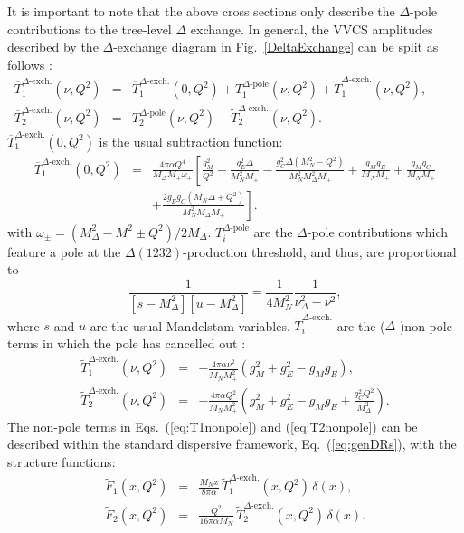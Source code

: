 \documentclass[12pt,preprint,tightenlines,
showpacs,preprintnumbers,amsmath,amssymb,
a4paper,nofootinbib]{revtex4-1}
\def\beq{\begin{equation}}
\def\eeq{\end{equation}}
\def\bea{\begin{eqnarray}}
\def\eea{\end{eqnarray}}
\def\eqlab#1{\label{eq:#1}}
\def\Eqref#1{Eq.~(\ref{eq:#1})}
\def\al{\alpha}
\def\nn{\nonumber}
\def\ol#1{\overline{#1}}
\begin{document}
It is important to note that the above cross sections only describe the $\Delta$-pole contributions to the tree-level $\Delta$ exchange. In general, the VVCS amplitudes described by the $\Delta$-exchange diagram in Fig.~\ref{DeltaExchange} can be split as follows \cite{Hagelstein:2018bdi}:
\bea
\ol T_1^{\Delta\text{-exch.}}(\nu,Q^2)&=&\ol T_1^{\Delta\text{-exch.}}(0,Q^2)+T_1^{\Delta\text{-pole}}(\nu,Q^2)+\widetilde T_1^{\Delta\text{-exch.}}(\nu,Q^2),\qquad\;\\
\ol T_2^{\Delta\text{-exch.}}(\nu,Q^2)&=&T_2^{\Delta\text{-pole}}(\nu,Q^2)+\widetilde T_2^{\Delta\text{-exch.}}(\nu,Q^2).
\eea
$\ol T_1^{\Delta\text{-exch.}}(0,Q^2)$ is the usual subtraction function:
\bea
\ol T_1^{\Delta\text{-exch.}}(0,Q^2)&=&\frac{4\pi \al Q^4}{M_\Delta M_+ \omega_+}\left[\frac{g_M^2}{Q^2}-\frac{g_E^2 \varDelta}{M_N^2 M_+}-\frac{g_C^2 \varDelta \left(M_N^2-Q^2\right)}{M_N^2 M_\Delta^2 M_+}+\frac{g_M g_E}{M_N M_+}+\frac{g_M g_C}{M_N M_+}\right.\eqlab{T1su}\\
&&+\left.\frac{2 g_E g_C \left(M_N\varDelta +Q^2\right)}{M_N^2 M_\Delta M_+}\right].\nn
\eea
with  $\omega_\pm=(M_\Delta^2-M^2\pm Q^2)/2M_\Delta$. $T_i^{\Delta\text{-pole}}$ are the $\Delta$-pole contributions which feature a pole at the $\Delta(1232)$-production threshold, and thus, are proportional to
\beq
\frac{1}{[s-M_\Delta^2][u-M_\Delta^2]}=\frac{1}{4M_N^2}\frac{1}{\nu_\Delta^2-\nu^2}, \eqlab{poleStruc}
\eeq
 where $s$ and $u$ are the usual Mandelstam variables. $\widetilde T_i^{\Delta\text{-exch.}}$ are the ($\Delta$-)non-pole terms in which the pole has cancelled out \cite{Hagelstein:2018bdi}:
 \bea
\widetilde T_1^{\Delta\text{-exch.}}(\nu,Q^2)&=&-\frac{4\pi \al  \nu^2}{M_N M_+^2}\left(g_M^2+g_E^2-g_M g_E\right),\eqlab{T1nonpole}\\
\widetilde T_2^{\Delta\text{-exch.}}(\nu,Q^2)&=&-\frac{4\pi \al Q^2}{M_N M_+^2}\left(g_M^2+g_E^2-g_M g_E+\frac{g_C^2 Q^2}{M_\Delta^2}\right).\eqlab{T2nonpole}
\eea
 The non-pole terms in Eqs.~(\ref{eq:T1nonpole}) and (\ref{eq:T2nonpole}) can be described within the standard dispersive framework, \Eqref{genDRs}, with the structure functions:
\bea
\widetilde F_1(x,Q^2)&=&\frac{M_N x}{8 \pi \al} \,\widetilde T_1^{\Delta\text{-exch.}}(x,Q^2)\, \delta (x),\\
\widetilde F_2(x,Q^2)&=&\frac{Q^2}{16 \pi \al M_N} \,\widetilde T_2^{\Delta\text{-exch.}}(x,Q^2)\, \delta (x).
\eea
\end{document}

